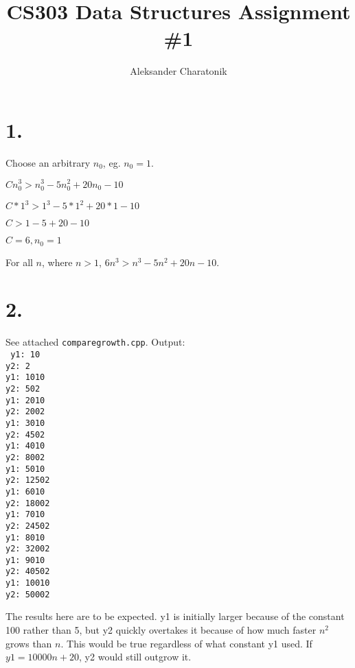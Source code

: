 \documentclass[12pt]{article}
\title{CS303 Data Structures Assignment \#1}
\author{Aleksander Charatonik}
\begin{document}
\maketitle

\section*{1.}
{\small
Choose an arbitrary \(n_0\), eg. \(n_0=1\).

\(Cn_0^3>n_0^3-5n_0^2+20n_0-10\)

\(C*1^3>1^3-5*1^2+20*1-10\)

\(C>1-5+20-10\)

\(C=6, n_0=1\)\\
}
For all \(n\), where \(n>1\), \(6n^3>n^3-5n^2+20n-10\).\\

\section*{2.}
See attached \texttt{comparegrowth.cpp}. Output:\\
\texttt{
y1: 10\\
y2: 2\\
y1: 1010\\
y2: 502\\
y1: 2010\\
y2: 2002\\
y1: 3010\\
y2: 4502\\
y1: 4010\\
y2: 8002\\
y1: 5010\\
y2: 12502\\
y1: 6010\\
y2: 18002\\
y1: 7010\\
y2: 24502\\
y1: 8010\\
y2: 32002\\
y1: 9010\\
y2: 40502\\
y1: 10010\\
y2: 50002\\
}

The results here are to be expected. y1 is initially larger because of the constant 100 rather than 5, but y2 quickly overtakes it because of how much faster \(n^2\) grows than \(n\). This would be true regardless of what constant y1 used. If \(y1=10000n +20\), y2 would still outgrow it.\\
\end{document}
